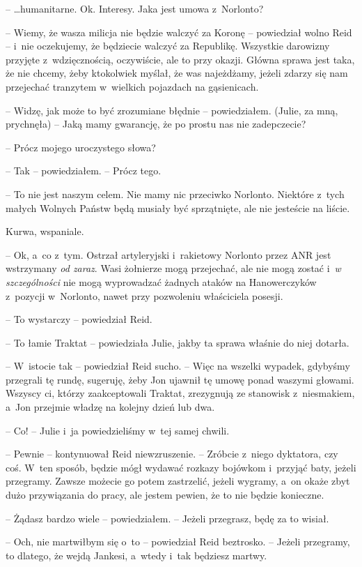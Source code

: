 \documentclass[oneside,polish,11pt,sfheadings]{mwbk}
\begin{document}
-- \ldots humanitarne. Ok. Interesy. Jaka jest umowa z~Norlonto?

-- Wiemy, że wasza milicja nie będzie walczyć za Koronę -- powiedział
wolno Reid -- i~nie oczekujemy, że będziecie walczyć za Republikę.
Wszystkie darowizny przyjęte z~wdzięcznością, oczywiście, ale to przy
okazji. Główna sprawa jest taka, że nie chcemy, żeby ktokolwiek myślał,
że was najeżdżamy, jeżeli zdarzy się nam przejechać tranzytem w~wielkich
pojazdach na gąsienicach.

-- Widzę, jak może to być zrozumiane błędnie -- powiedziałem. (Julie, za
mną, prychnęła) -- Jaką mamy gwarancję, że po prostu nas nie zadepczecie?

-- Prócz mojego uroczystego słowa?

-- Tak -- powiedziałem. -- Prócz tego.

-- To nie jest naszym celem. Nie mamy nic przeciwko Norlonto. Niektóre z~tych małych Wolnych Państw będą musiały być sprzątnięte, ale nie
jesteście na liście.

Kurwa, wspaniale. 

-- Ok, a~co z~tym. Ostrzał artyleryjski i~rakietowy
Norlonto przez ANR jest wstrzymany \emph{od zaraz}. Wasi żołnierze mogą
przejechać, ale nie mogą zostać i~\emph{w szczególności} nie mogą
wyprowadzać żadnych ataków na Hanowerczyków z~pozycji w~Norlonto, nawet
przy pozwoleniu właściciela posesji.

-- To wystarczy -- powiedział Reid.

-- To łamie Traktat -- powiedziała Julie, jakby ta sprawa właśnie do niej
dotarła.

-- W~istocie tak -- powiedział Reid sucho. -- Więc na wszelki wypadek,
gdybyśmy przegrali tę rundę, sugeruję, żeby Jon ujawnił tę umowę ponad
waszymi głowami. Wszyscy ci, którzy zaakceptowali Traktat, zrezygnują ze
stanowisk z~niesmakiem, a~Jon przejmie władzę na kolejny dzień lub dwa.

-- Co! -- Julie i~ja powiedzieliśmy w~tej samej chwili.

-- Pewnie -- kontynuował Reid niewzruszenie. -- Zróbcie z~niego dyktatora,
czy coś. W~ten sposób, będzie mógł wydawać rozkazy bojówkom i~przyjąć
baty, jeżeli przegramy. Zawsze możecie go potem zastrzelić, jeżeli
wygramy, a~on okaże zbyt dużo przywiązania do pracy, ale jestem pewien,
że to nie będzie konieczne.

-- Żądasz bardzo wiele -- powiedziałem. -- Jeżeli przegrasz, będę za to
wisiał.

-- Och, nie martwiłbym się o~to -- powiedział Reid beztrosko. -- Jeżeli
przegramy, to dlatego, że wejdą Jankesi, a~wtedy i~tak będziesz martwy.
\end{document}
